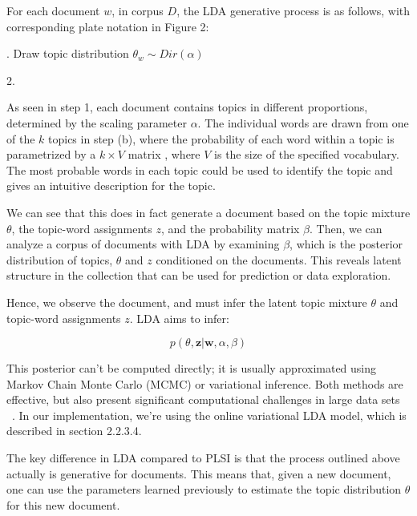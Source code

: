\documentclass[12pt]{report}
\begin{document}
For each document $w$, in corpus $D$, the LDA generative process is as follows, 
with corresponding plate notation in Figure 2:

\begin{algorithm}[H]
. Draw topic distribution $\theta_w \sim Dir(\alpha)$

2. 
\end{algorithm}

As seen in step 1, each document contains topics in different proportions,
determined by the scaling parameter $\alpha$. The individual words are drawn
from one of the $k$ topics in step (b), where the probability of each word
within a topic is parametrized by a $k \times V$ matrix , where $V$ is the
size of the specified vocabulary. The most probable words in each topic could
be used to identify the topic and gives an intuitive description for the topic.

We can see that this does in fact generate a document based on the topic 
mixture $\theta$, the topic-word assignments $z$, and the probability 
matrix $\beta$. Then, we can analyze a corpus of documents with LDA by 
examining $\beta$, which is the posterior distribution of topics, $\theta$ 
and $z$ conditioned on the documents. This reveals latent structure in
the collection that can be used for prediction or data exploration. 

Hence, we observe the document, and must infer the latent topic mixture 
$\theta$ and topic-word assignments $z$. LDA aims to infer:

\begin{equation}
p(\theta, \textbf{z} |\textbf{w}, \alpha, \beta)
\end{equation}

This
posterior can't be computed directly; it is usually approximated using Markov
Chain Monte Carlo (MCMC) or variational inference. Both methods are effective,
but also present significant computational challenges in large data sets
~\cite{onlineLDAvb}. In our implementation, we're using the online variational
LDA model, which is described in section 2.2.3.4.
 
The key difference in LDA compared to PLSI is that the process outlined above
actually is generative for documents. This means that, given a new document,
one can use the parameters learned previously to estimate the topic
distribution $\theta$ for this new document.
 
\end{document}
